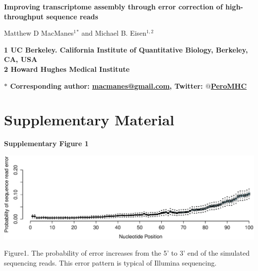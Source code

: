 \documentclass[11pt]{article}
\begin{document}
\begin{flushleft}


{\Large
\textbf{Improving transcriptome assembly through error correction of high-throughput sequence reads}
}
\\ 
\vspace{4mm}

\noindent
Matthew D MacManes$^{1}$$^\ast$ and
Michael B. Eisen$^{1,2}$ \\
\vspace{5mm}

\bf{1} \textnormal{UC Berkeley. California Institute of Quantitative Biology, Berkeley, CA, USA} \\
\bf{2} \textnormal{Howard Hughes Medical Institute} \\
\vspace{2mm}
 
\bf{$\ast$} \textnormal{Corresponding author: \href{mailto:macmanes@gmail.com}{macmanes@gmail.com}, Twitter: \href{https://twitter.com/PeroMHC}{$@$PeroMHC}}
\end{flushleft}
\vspace{4mm}

\section*{Supplementary Material}


\textbf{\hypertarget{Supplementary Figure 1}{Supplementary Figure 1}} \\
\centerline{\includegraphics[width=30.0\baselineskip]{newfig1.eps}}
\noindent
\begin{changemargin}{2cm}{2cm} 
Figure1. The probability of error increases from the 5' to 3' end of the simulated sequencing reads. This error pattern is typical of Illumina sequencing.  
\end{changemargin}
\end{document}
